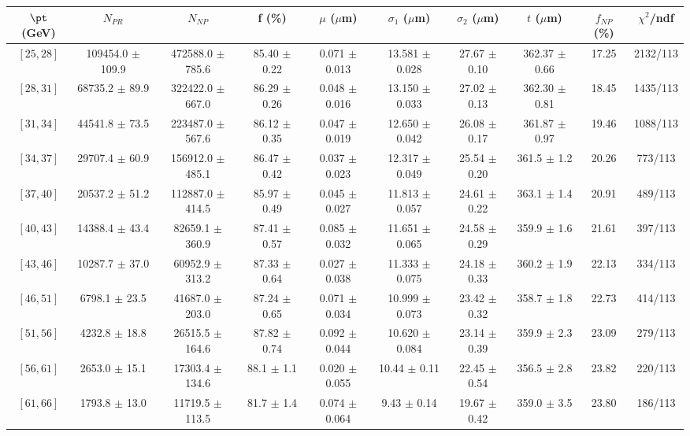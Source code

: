 \begin{tabular}{c||c|c|c|c|c|c|c||c|c}
$\pt$ (GeV) & $N_{PR}$ & $N_{NP}$ & f (\%) & $\mu$ ($\mu$m) & $\sigma_1$ ($\mu$m) & $\sigma_2$ ($\mu$m)  & $t$ ($\mu$m) & $f_{NP}$ (\%) & $\chi^2$/ndf \\
\hline
$[25, 28]$ & 109454.0 $\pm$ 109.9 & 472588.0 $\pm$ 785.6 & 85.40 $\pm$ 0.22 & 0.071 $\pm$ 0.013 & 13.581 $\pm$ 0.028 & 27.67 $\pm$ 0.10 & 362.37 $\pm$ 0.66 & 17.25 & 2132/113\\
$[28, 31]$ & 68735.2 $\pm$ 89.9 & 322422.0 $\pm$ 667.0 & 86.29 $\pm$ 0.26 & 0.048 $\pm$ 0.016 & 13.150 $\pm$ 0.033 & 27.02 $\pm$ 0.13 & 362.30 $\pm$ 0.81 & 18.45 & 1435/113\\
$[31, 34]$ & 44541.8 $\pm$ 73.5 & 223487.0 $\pm$ 567.6 & 86.12 $\pm$ 0.35 & 0.047 $\pm$ 0.019 & 12.650 $\pm$ 0.042 & 26.08 $\pm$ 0.17 & 361.87 $\pm$ 0.97 & 19.46 & 1088/113\\
$[34, 37]$ & 29707.4 $\pm$ 60.9 & 156912.0 $\pm$ 485.1 & 86.47 $\pm$ 0.42 & 0.037 $\pm$ 0.023 & 12.317 $\pm$ 0.049 & 25.54 $\pm$ 0.20 & 361.5 $\pm$ 1.2 & 20.26 & 773/113\\
$[37, 40]$ & 20537.2 $\pm$ 51.2 & 112887.0 $\pm$ 414.5 & 85.97 $\pm$ 0.49 & 0.045 $\pm$ 0.027 & 11.813 $\pm$ 0.057 & 24.61 $\pm$ 0.22 & 363.1 $\pm$ 1.4 & 20.91 & 489/113\\
$[40, 43]$ & 14388.4 $\pm$ 43.4 & 82659.1 $\pm$ 360.9 & 87.41 $\pm$ 0.57 & 0.085 $\pm$ 0.032 & 11.651 $\pm$ 0.065 & 24.58 $\pm$ 0.29 & 359.9 $\pm$ 1.6 & 21.61 & 397/113\\
$[43, 46]$ & 10287.7 $\pm$ 37.0 & 60952.9 $\pm$ 313.2 & 87.33 $\pm$ 0.64 & 0.027 $\pm$ 0.038 & 11.333 $\pm$ 0.075 & 24.18 $\pm$ 0.33 & 360.2 $\pm$ 1.9 & 22.13 & 334/113\\
$[46, 51]$ & 6798.1 $\pm$ 23.5 & 41687.0 $\pm$ 203.0 & 87.24 $\pm$ 0.65 & 0.071 $\pm$ 0.034 & 10.999 $\pm$ 0.073 & 23.42 $\pm$ 0.32 & 358.7 $\pm$ 1.8 & 22.73 & 414/113\\
$[51, 56]$ & 4232.8 $\pm$ 18.8 & 26515.5 $\pm$ 164.6 & 87.82 $\pm$ 0.74 & 0.092 $\pm$ 0.044 & 10.620 $\pm$ 0.084 & 23.14 $\pm$ 0.39 & 359.9 $\pm$ 2.3 & 23.09 & 279/113\\
$[56, 61]$ & 2653.0 $\pm$ 15.1 & 17303.4 $\pm$ 134.6 & 88.1 $\pm$ 1.1 & 0.020 $\pm$ 0.055 & 10.44 $\pm$ 0.11 & 22.45 $\pm$ 0.54 & 356.5 $\pm$ 2.8 & 23.82 & 220/113\\
$[61, 66]$ & 1793.8 $\pm$ 13.0 & 11719.5 $\pm$ 113.5 & 81.7 $\pm$ 1.4 & 0.074 $\pm$ 0.064 & 9.43 $\pm$ 0.14 & 19.67 $\pm$ 0.42 & 359.0 $\pm$ 3.5 & 23.80 & 186/113\\

\end{tabular}
